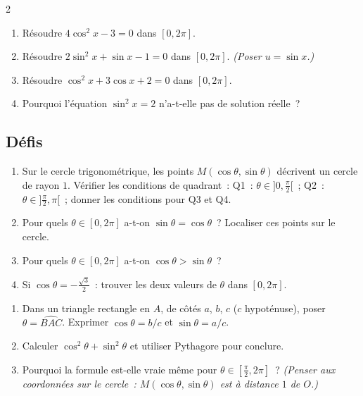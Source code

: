 \begin{probleme}{2}
\begin{enumerate}
  \item R\'esoudre $4\cos^2 x - 3 = 0$ dans $[0,2\pi]$.
  \item R\'esoudre $2\sin^2 x + \sin x - 1 = 0$ dans $[0,2\pi]$.
        \emph{(Poser $u=\sin x$.)}
  \item R\'esoudre $\cos^2 x + 3\cos x + 2 = 0$ dans $[0,2\pi]$.
  \item Pourquoi l'\'equation $\sin^2 x = 2$ n'a-t-elle pas de solution r\'eelle~?
\end{enumerate}
\end{probleme}

\subsection*{D\'efis}

\begin{challenge}
\begin{enumerate}
  \item Sur le cercle trigonom\'etrique, les points $M(\cos\theta,\sin\theta)$
        d\'ecrivent un cercle de rayon $1$.
        V\'erifier les conditions de quadrant~:
        Q1~: $\theta\in]0,\frac{\pi}{2}[$~; Q2~: $\theta\in]\frac{\pi}{2},\pi[$~;
        donner les conditions pour Q3 et Q4.
  \item Pour quels $\theta\in[0,2\pi]$ a-t-on $\sin\theta=\cos\theta$~?
        Localiser ces points sur le cercle.
  \item Pour quels $\theta\in[0,2\pi]$ a-t-on $\cos\theta>\sin\theta$~?
  \item Si $\cos\theta=-\frac{\sqrt{3}}{2}$~: trouver les deux valeurs de $\theta$
        dans $[0,2\pi]$.
\end{enumerate}
\end{challenge}

\begin{challenge}
\begin{enumerate}
  \item Dans un triangle rectangle en $A$, de c\^ot\'es $a$, $b$, $c$
        ($c$ hypot\'enuse), poser $\theta=\widehat{BAC}$.
        Exprimer $\cos\theta=b/c$ et $\sin\theta=a/c$.
  \item Calculer $\cos^2\theta+\sin^2\theta$ et utiliser Pythagore pour conclure.
  \item Pourquoi la formule est-elle vraie m\^eme pour $\theta\in[\frac{\pi}{2},2\pi]$~?
        \emph{(Penser aux coordonn\'ees sur le cercle~:
        $M(\cos\theta,\sin\theta)$ est \`a distance $1$ de $O$.)}
\end{enumerate}
\end{challenge}

